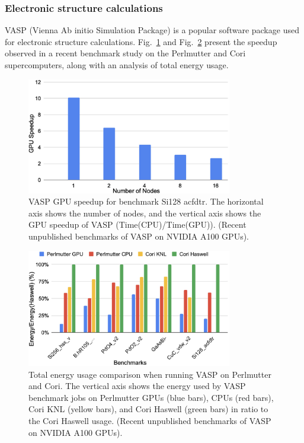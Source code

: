 \subsubsection{Electronic structure calculations}


\par
VASP (Vienna Ab initio Simulation Package) is a popular software package used for electronic structure calculations.
Fig.~\ref{fig:vasp_gpu} and Fig.~\ref{fig:vasp_energy} present the speedup observed in a recent benchmark study on the Perlmutter and Cori supercomputers, along with an analysis of total energy usage.


\begin{figure}[!h]
\centering\includegraphics[width=0.8\textwidth]{fig_problem/vasp_gpu.jpg}
\caption{VASP GPU speedup for benchmark Si128 acfdtr. The horizontal axis shows the number of nodes, and the vertical axis shows the GPU speedup of VASP (Time(CPU)/Time(GPU)). (Recent unpublished benchmarks of VASP on NVIDIA A100 GPUs).}\label{fig:vasp_gpu}
\end{figure}


\begin{figure}[!h]
\centering\includegraphics[width=0.8\textwidth]{fig_problem/vasp_energy.jpg}
\caption{Total energy usage comparison when running VASP on Perlmutter and Cori. The vertical axis shows the energy used by VASP benchmark jobs on Perlmutter GPUs (blue bars), CPUs (red bars), Cori KNL (yellow bars), and Cori Haswell (green bars) in ratio to the Cori Haswell usage. (Recent unpublished benchmarks of VASP on NVIDIA A100 GPUs).}\label{fig:vasp_energy}
\end{figure}


